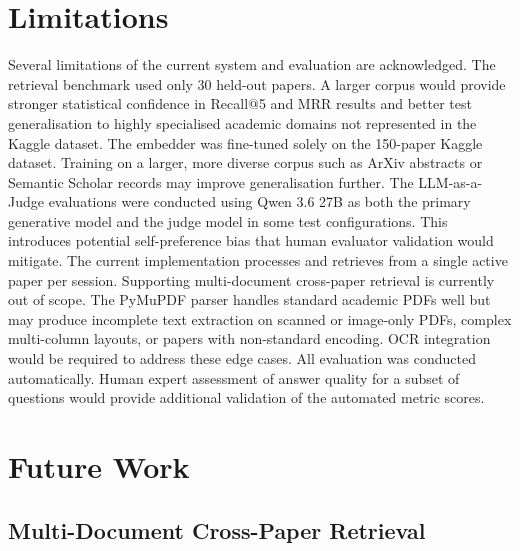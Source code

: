 \section{Limitations}

Several limitations of the current system and evaluation are acknowledged.
\newline \newline The retrieval benchmark used only 30 held-out papers. A larger corpus would provide stronger statistical confidence in Recall@5 and MRR results and better test generalisation to highly specialised academic domains not represented in the Kaggle dataset.
\newline \newline The embedder was fine-tuned solely on the 150-paper Kaggle dataset. Training on a larger, more diverse corpus such as ArXiv abstracts or Semantic Scholar records may improve generalisation further.
\newline \newline The LLM-as-a-Judge evaluations were conducted using Qwen 3.6 27B as both the primary generative model and the judge model in some test configurations. This introduces potential self-preference bias that human evaluator validation would mitigate.
\newline \newline The current implementation processes and retrieves from a single active paper per session. Supporting multi-document cross-paper retrieval is currently out of scope.
\newline \newline The PyMuPDF parser handles standard academic PDFs well but may produce incomplete text extraction on scanned or image-only PDFs, complex multi-column layouts, or papers with non-standard encoding. OCR integration would be required to address these edge cases.
\newline \newline All evaluation was conducted automatically. Human expert assessment of answer quality for a subset of questions would provide additional validation of the automated metric scores.

\section{Future Work}

\subsection{Multi-Document Cross-Paper Retrieval}

